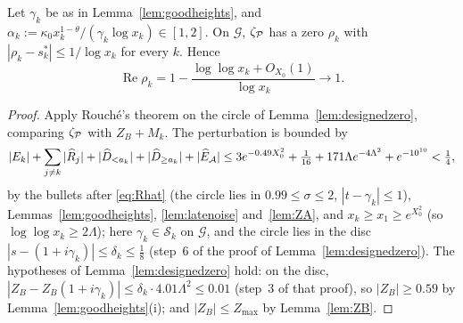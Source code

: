 \begin{theorem}[Zeros]\label{thm:zeros}
Let $\gamma_k$ be as in Lemma~\ref{lem:goodheights}, and $\alpha_k:=\kappa_0x_k^{1-\theta}/(\gamma_k\log x_k)\in[1,2]$. On
$\mathcal G$, $\zeta_{\mathcal{P}}$ has a zero $\rho_k$ with $|\rho_k-s^*_k|\le1/\log x_k$ for every $k$. Hence
\[
  \operatorname{Re}\rho_k=1-\frac{\log\log x_k+O_{X_0}(1)}{\log x_k}\longrightarrow1.
\]
\end{theorem}
\begin{proof}
Apply Rouch\'e's theorem on the circle of Lemma~\ref{lem:designedzero}, comparing $\zeta_{\mathcal{P}}$ with $Z_B+M_k$. The perturbation is
bounded by
\[
  |E_k|+\sum_{j\ne k}|\widehat R_j|+|\widehat D_{<a_k}|+|\widehat D_{\ge a_k}|+|\widehat E_{\mathcal{A}}|
  \le3e^{-0.49X_0^2}+\tfrac1{16}+171\Lambda e^{-4\Lambda^2}+e^{-10^{10}}<\tfrac14,
\]
by the bullets after \eqref{eq:Rhat} (the circle lies in $0.99\le\sigma\le2$, $|t-\gamma_k|\le1$), Lemmas~\ref{lem:goodheights},
\ref{lem:latenoise} and~\ref{lem:ZA}, and $x_k\ge x_1\ge e^{X_0^2}$ (so $\log\log x_k\ge2\Lambda$); here $\gamma_k\in\mathcal S_k$ on $\mathcal G$, and the circle lies in the
disc $|s-(1+i\gamma_k)|\le\delta_k\le\frac18$ (step~6 of the proof of Lemma~\ref{lem:designedzero}). The hypotheses of
Lemma~\ref{lem:designedzero} hold: on the disc, $|Z_B-Z_B(1+i\gamma_k)|\le\delta_k\cdot4.01\Lambda^2\le0.01$ (step~3 of that
proof), so $|Z_B|\ge0.59$ by Lemma~\ref{lem:goodheights}(i); and $|Z_B|\le Z_{\max}$ by Lemma~\ref{lem:ZB}.
\end{proof}

